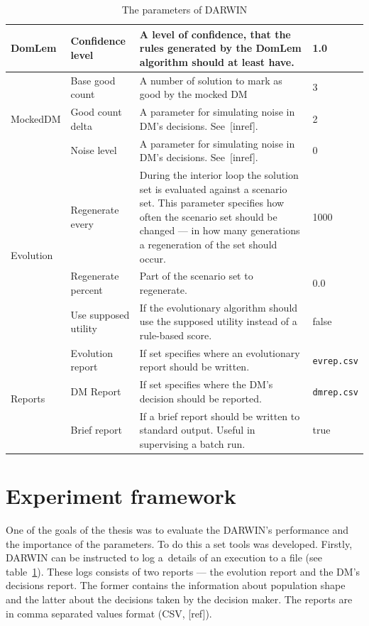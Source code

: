 \begin{table}
\begin{tabular}{l l p{7cm} l}
    \hline
    DomLem & Confidence level & A level of confidence, that the rules generated by the
    DomLem algorithm should at least have. & 1.0 \\
    \hline
    \multirow{3}{*}{MockedDM} & Base good count & A number of solution to mark
    as good by the mocked DM& 3 \\
    & Good count delta & A parameter for simulating noise in DM's decisions. See~[inref]. & 2 \\
    & Noise level & A parameter for simulating noise in DM's decisions. See~[inref]. & 0 \\
    \hline
    \multirow{3}{*}{Evolution} & Regenerate every & During the interior loop
    the solution set is evaluated against a scenario set. This parameter
    specifies how often the scenario set should be changed --- in how many
    generations a regeneration of the set should occur. & 1000 \\
    & Regenerate percent & Part of the scenario set to regenerate. & 0.0 \\
    & Use supposed utility & If the evolutionary algorithm should use the
    supposed utility instead of a rule-based score. & false \\
  \hline
  \multirow{3}{*}{Reports} & Evolution report & If set specifies where an
  evolutionary report should be written.  & \texttt{evrep.csv} \\
  & DM Report & If set specifies where the DM's decision should be reported. & \texttt{dmrep.csv} \\
  &  Brief report & If a brief report should be written to standard
  output. Useful in supervising a batch run. & true \\
  \hline
  \end{tabular}
  \caption{The parameters of DARWIN}
  \label{t:params}
\end{table}


\section{Experiment framework}
One of the goals of the thesis was to evaluate the DARWIN's performance and
the importance of the parameters. To do this a set tools was
developed. Firstly, DARWIN can be instructed to log a~details of an execution
to a file (see table~\ref{t:params}). These logs consists of two reports ---
the evolution report and the DM's decisions report. The former contains the
information about population shape and the latter about the decisions taken by
the decision maker. The reports are in comma separated values format (CSV,
[ref]).

